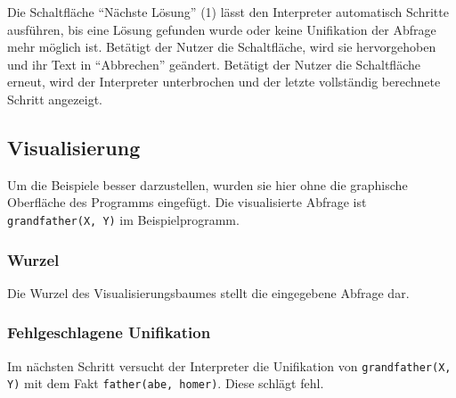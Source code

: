 \documentclass[parskip=full,11pt,twoside]{scrartcl}
\begin{document}
\begin{minipage}{\linewidth}
\end{minipage}

Die Schaltfläche \enquote{Nächste Lösung} (1) lässt den Interpreter automatisch Schritte ausführen, bis eine Lösung gefunden wurde oder keine Unifikation der Abfrage mehr möglich ist.
Betätigt der Nutzer die Schaltfläche, wird sie hervorgehoben und ihr Text in \enquote{Abbrechen} geändert.
Betätigt der Nutzer die Schaltfläche erneut, wird der Interpreter unterbrochen und der letzte vollständig berechnete Schritt angezeigt.

\subsection{Visualisierung}

Um die Beispiele besser darzustellen, wurden sie hier ohne die graphische Oberfläche des Programms eingefügt.
Die visualisierte Abfrage ist \texttt{grandfather(X, Y)} im Beispielprogramm.

\subsubsection{Wurzel}

\begin{minipage}{\linewidth}
\end{minipage}

Die Wurzel des Visualisierungsbaumes stellt die eingegebene Abfrage dar.

\subsubsection{Fehlgeschlagene Unifikation}

Im nächsten Schritt versucht der Interpreter die Unifikation von \texttt{grandfather(X, Y)} mit dem Fakt \texttt{father(abe, homer)}.
Diese schlägt fehl.

\begin{minipage}{\linewidth}
\end{minipage}
\end{document}
